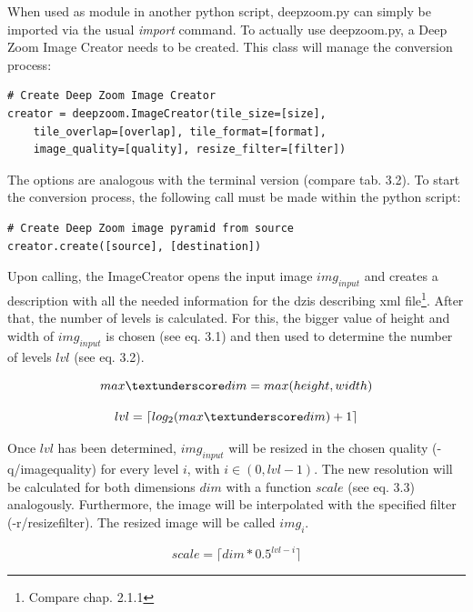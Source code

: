 When used as module in another python script, deepzoom.py can simply be imported via the usual \emph{import} command. To actually use deepzoom.py, a Deep Zoom Image Creator needs to be created. This class will manage the conversion process:

\begin{lstlisting}[frame=single]
# Create Deep Zoom Image Creator
creator = deepzoom.ImageCreator(tile_size=[size], 
	tile_overlap=[overlap],	tile_format=[format], 
	image_quality=[quality], resize_filter=[filter])
\end{lstlisting}

The options are analogous with the terminal version (compare tab. 3.2). To start the conversion process, the following call must be made within the python script:

\begin{lstlisting}[frame=single]
# Create Deep Zoom image pyramid from source
creator.create([source], [destination])
\end{lstlisting}

Upon calling, the ImageCreator opens the input image $img_{input}$ and creates a description with all the needed information for the dzis describing xml file\footnote{Compare chap. 2.1.1}. After that, the number of levels is calculated. For this, the bigger value of height and width of $img_{input}$ is chosen (see eq. 3.1) and then used to determine the number of levels $lvl$ (see eq. 3.2).

\begin{equation}
	max{\textunderscore}dim = max(height, width)
\end{equation}

\begin{equation}
	lvl = {\lceil}log_2(max{\textunderscore}dim) + 1\rceil
\end{equation}

Once $lvl$ has been determined, $img_{input}$ will be resized in the chosen quality (-q/image{\textunderscore}quality) for every level $i$, with $i \in (0, lvl-1)$. The new resolution will be calculated for both dimensions $dim$ with a function $scale$ (see eq. 3.3) analogously. Furthermore, the image will be interpolated with the specified filter (-r/resize{\textunderscore}filter). The resized image will be called $img_i$.

\begin{equation}
	scale = {\lceil}dim * 0.5^{lvl-i}\rceil
\end{equation}

